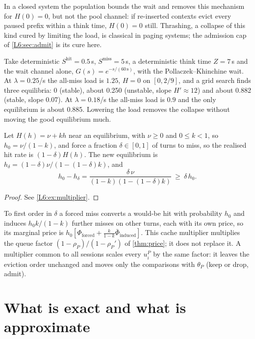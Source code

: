In a closed system the population bounds the wait and removes this mechanism for $H(0)=0$,
but not the pool channel: if re-inserted contexts evict every paused prefix within a
think time, $H(0)=0$ still. Thrashing, a collapse of this kind cured by limiting the
load, is classical in paging systems; the admission cap of \cref{L6:sec:admit} is its
cure here.

\begin{example}\label{L6:ex:bistable}
Take deterministic $S^{\mathrm{hit}}=0.5$\,s, $S^{\mathrm{miss}}=5$\,s, a deterministic think time $Z=7$\,s and the
wait channel alone, $G(s)=e^{-s/(60\,\mathrm{s})}$, with the Pollaczek--Khinchine wait. At
$\lambda=0.25$/s the all-miss load is $1.25$, $H=0$ on $[0,2/9]$, and a grid search finds
three equilibria: 0 (stable), about 0.250 (unstable, slope $H'\approx12$) and about
0.882 (stable, slope 0.07). At $\lambda=0.18$/s the all-miss load is $0.9$ and the only
equilibrium is about 0.885. Lowering the load removes the collapse without moving the
good equilibrium much.
\end{example}

\begin{proposition}\label{L6:prop:multiplier}
Let $H(h)=\nu+kh$ near an equilibrium, with $\nu\ge0$ and $0\le k<1$, so $h_0=\nu/(1-k)$, and
force a fraction $\delta\in[0,1]$ of turns to miss, so the realised hit rate is
$(1-\delta)H(h)$. The new equilibrium is $h_\delta=(1-\delta)\nu/(1-(1-\delta)k)$, and
\[
  h_0-h_\delta=\frac{\delta\,\nu}{(1-k)(1-(1-\delta)k)}\ \ge\ \delta\,h_0 .
\]
\end{proposition}

\begin{proof}See \cref{L6:ex:multiplier}.\end{proof}

To first order in $\delta$ a forced miss converts a would-be hit with probability $h_0$
and induces $h_0k/(1-k)$ further misses on other turns, each with its own price, so its
marginal price is $h_0[\Phi_{\mathrm{forced}}+\tfrac{k}{1-k}\bar\Phi_{\mathrm{induced}}]$.
This cache multiplier multiplies the queue factor $(1-\rho_P)/(1-\rho_P')$ of
\cref{thm:price}; it does not replace it. A multiplier common to all sessions scales
every $u^P_i$ by the same factor: it leaves the eviction order unchanged and moves only
the comparisons with $\theta_P$ (keep or drop, admit).

\section{What is exact and what is approximate}\label{L6:sec:honest}

